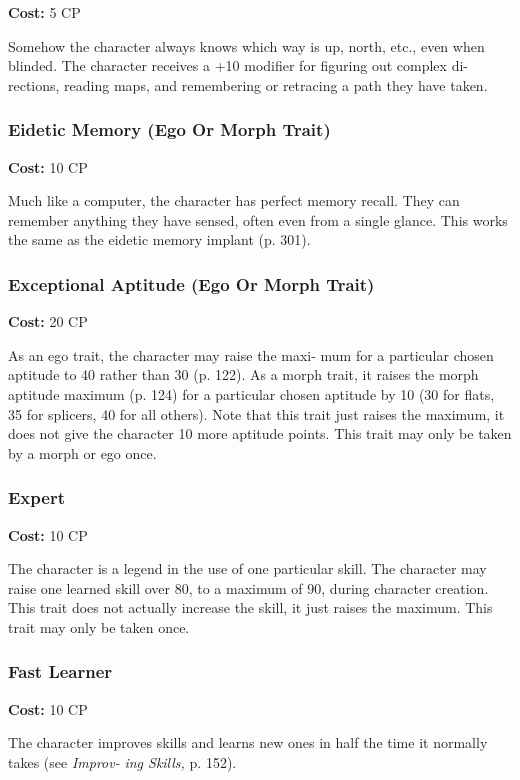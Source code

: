 \textbf{Cost:} 5 CP

Somehow the character always knows which way 
is up, north, etc., even when blinded. The character 
receives a +10 modifier for figuring out complex di-
rections, reading maps, and remembering or retracing 
a path they have taken.

\subsubsection{Eidetic Memory (Ego Or Morph Trait)}

\textbf{Cost:} 10 CP

Much like a computer, the character has perfect 
memory recall. They can remember anything they have 
sensed, often even from a single glance. This works the 
same as the eidetic memory implant (p. 301).

\subsubsection{Exceptional Aptitude (Ego Or Morph Trait)}

\textbf{Cost:} 20 CP

As an ego trait, the character may raise the maxi-
mum for a particular chosen aptitude to 40 rather 
than 30 (p. 122). As a morph trait, it raises the morph 
aptitude maximum (p. 124) for a particular chosen 
aptitude by 10 (30 for flats, 35 for splicers, 40 for all 
others). Note that this trait just raises the maximum, 
it does not give the character 10 more aptitude points. 
This trait may only be taken by a morph or ego once.

\subsubsection{Expert}

\textbf{Cost:} 10 CP

The character is a legend in the use of one particular 
skill. The character may raise one learned skill over 80, 
to a maximum of 90, during character creation. This 
trait does not actually increase the skill, it just raises 
the maximum. This trait may only be taken once.

\subsubsection{Fast Learner}

\textbf{Cost:} 10 CP

The character improves skills and learns new 
ones in half the time it normally takes (see \textit{Improv-}
\textit{ing Skills, }p. 152).

